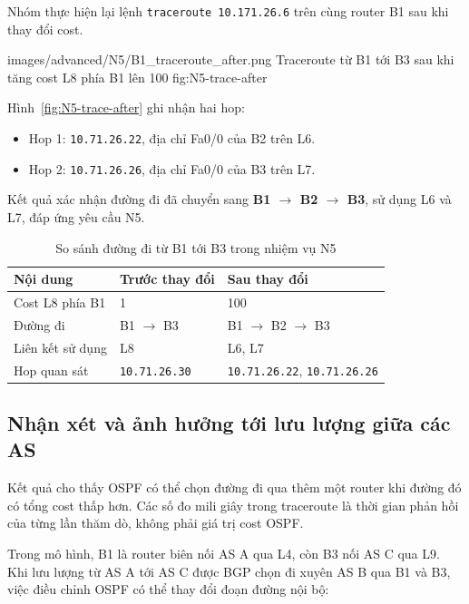 Nhóm thực hiện lại lệnh \texttt{traceroute 10.171.26.6}
trên cùng router B1 sau khi thay đổi cost.

\partzeroimage
{images/advanced/N5/B1_traceroute_after.png}
{Traceroute từ B1 tới B3 sau khi tăng cost L8 phía B1 lên 100}
{fig:N5-trace-after}

Hình~\ref{fig:N5-trace-after} ghi nhận hai hop:
\begin{itemize}
    \item Hop 1: \texttt{10.71.26.22}, địa chỉ Fa0/0
    của B2 trên L6.
    \item Hop 2: \texttt{10.71.26.26}, địa chỉ Fa0/0
    của B3 trên L7.
\end{itemize}

Kết quả xác nhận đường đi đã chuyển sang
\textbf{B1 $\rightarrow$ B2 $\rightarrow$ B3},
sử dụng L6 và L7, đáp ứng yêu cầu N5.

\begin{table}[H]
\centering
\caption{So sánh đường đi từ B1 tới B3 trong nhiệm vụ N5}
\label{tab:N5-comparison}
\small
\renewcommand{\arraystretch}{1.3}
\begin{tabularx}{\textwidth}{l X X}
\toprule
\textbf{Nội dung} & \textbf{Trước thay đổi} & \textbf{Sau thay đổi} \\
\midrule
Cost L8 phía B1 & 1 & 100 \\
Đường đi & B1 $\rightarrow$ B3 & B1 $\rightarrow$ B2 $\rightarrow$ B3 \\
Liên kết sử dụng & L8 & L6, L7 \\
Hop quan sát & \texttt{10.71.26.30} &
\texttt{10.71.26.22}, \texttt{10.71.26.26} \\
\bottomrule
\end{tabularx}
\end{table}

\subsection{Nhận xét và ảnh hưởng tới lưu lượng giữa các AS}

Kết quả cho thấy OSPF có thể chọn đường đi qua thêm một router
khi đường đó có tổng cost thấp hơn.
Các số đo mili giây trong traceroute là thời gian phản hồi
của từng lần thăm dò, không phải giá trị cost OSPF.

Trong mô hình, B1 là router biên nối AS A qua L4,
còn B3 nối AS C qua L9. Khi lưu lượng từ AS A tới AS C
được BGP chọn đi xuyên AS B qua B1 và B3,
việc điều chỉnh OSPF có thể thay đổi đoạn đường nội bộ:

